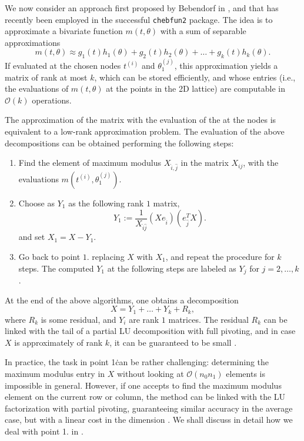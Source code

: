 \documentclass[]{article}
\begin{document}
We now consider an approach first proposed by Bebendorf 
in \cite{bebendorf2003adaptive}, and that has recently been employed in 
the successful \texttt{chebfun2} package. The idea is 
to approximate a bivariate function $m(t, \theta)$ with a 
sum of separable approximations
\[
    m(t, \theta) \approx 
      g_1(t) h_1(\theta) + g_2(t) h_2(\theta) + \ldots 
      + g_k(t) h_k(\theta). 
\]
If evaluated at the chosen nodes $t^{(i)}$ and 
$\theta_1^{(j)}$, this approximation yields a matrix 
of rank at most $k$, which can be stored efficiently, and 
whose entries (i.e., the evaluations of $m(t,\theta)$ at the 
points in the 2D lattice) are computable in $\mathcal O(k)$ 
operations. 

The approximation of the matrix with the  evaluation of the  
at the nodes is equivalent to a low-rank approximation 
problem. The evaluation of the above decompositions 
can be obtained performing the following 
steps:
\begin{enumerate}
    \item Find the element of maximum modulus  $X_{\hat i, \hat j}$
      in the matrix 
      $X_{ij}$, with the evaluations 
      $m(t^{(i)}, \theta_1^{(j)})$. 
    \item Choose as $Y_1$ as the following rank $1$ matrix,
      \[
          Y_1 := \frac{1}{X_{\hat i \hat j}} 
            (X e_{\hat i}) (e_{\hat j}^T X).
      \]
      and set $X_1 = X - Y_1$. 
    \item Go back to point $1.$ replacing $X$ with $X_1$, and repeat 
      the procedure for $k$ steps. The computed $Y_1$ at the following 
      steps are labeled as $Y_j$ for $j = 2, \ldots, k$. 
\end{enumerate}

At the end of the above algorithms, one obtains a decomposition 
\[
    X = Y_1 + \ldots + Y_k + R_k, 
\]
where $R_k$ is some residual, and $Y_i$ are rank $1$ matrices. The 
residual $R_k$ can be linked with the tail of a partial LU decomposition 
with full pivoting, and in case $X$ is approximately of rank $k$, 
it can be guaranteed to be small \cite{bebendorf2003adaptive,townsend2013extension}. 

In practice, the task in point 1\. can be rather challenging: determining the
maximum modulus entry in $X$ without looking at $\mathcal O(n_0 n_1)$ 
elements is impossible in general. However, if one 
accepts to find the maximum modulus element on the current row 
or column, the method can be linked with the LU factorization 
with partial pivoting, guaranteeing similar accuracy 
in the average case, but with a linear 
cost in the dimension \cite{bebendorf2003adaptive}. 
We shall discuss in detail how we deal with
point 1. in . 
\end{document}
